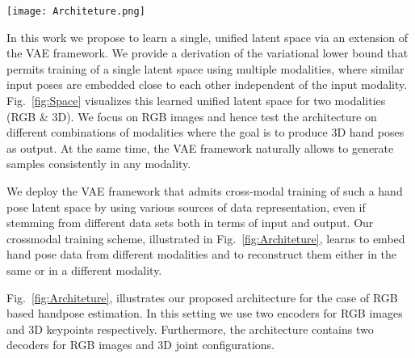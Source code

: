 \documentclass[10pt,twocolumn,letterpaper]{article}
\begin{document}
\begin{figure*}
\begin{center}
   \texttt{[image: Architeture.png]}
\end{center}
   \caption{\textbf{Schematic overview of our architecture.} Left: a cross-modal latent space z is learned by training pairs of encoder
and decoder q, p networks across multiple modalities (e.g., RGB images to 3D hand poses). Auxilliary encoder-decoder pairs
help in regularizing the latent space. Right: The approach allows to embed input samples of one set of modalities (here:
RGB, 3D) and to produce consistent and plausible posterior estimates in several different modalities (RGB, 2D and 3D).}
\label{fig:Architeture}
\end{figure*}

In this work we propose to learn a single, unified latent
space via an extension of the VAE framework. We provide a
derivation of the variational lower bound that permits training
of a single latent space using multiple modalities, where
similar input poses are embedded close to each other independent
of the input modality. Fig.~\ref{fig:Space} visualizes this learned
unified latent space for two modalities (RGB \& 3D). We
focus on RGB images and hence test the architecture on
different combinations of modalities where the goal is to
produce 3D hand poses as output. At the same time, the
VAE framework naturally allows to generate samples consistently
in any modality.\par

We deploy the VAE framework that admits cross-modal
training of such a hand pose latent space by using various
sources of data representation, even if stemming from different
data sets both in terms of input and output. Our crossmodal
training scheme, illustrated in Fig.~\ref{fig:Architeture}, learns to embed
hand pose data from different modalities and to reconstruct
them either in the same or in a different modality.\par
Fig.~\ref{fig:Architeture}, illustrates our proposed architecture for the case
of RGB based handpose estimation. In this setting we use
two encoders for RGB images and 3D keypoints respectively.
Furthermore, the architecture contains two decoders
for RGB images and 3D joint configurations.\par

{\small


}
\end{document}
